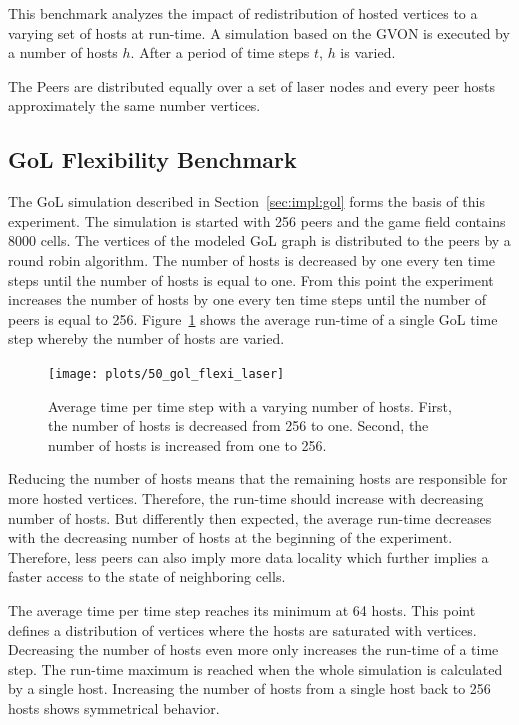 This benchmark analyzes the impact of redistribution of hosted
vertices to a varying set of hosts at run-time. A simulation based on the
GVON is executed by a number of hosts $h$. After a period of time steps
$t$, $h$ is varied.

The Peers are distributed equally over a set of laser nodes and
every peer hosts approximately the same number vertices.

\subsection{GoL Flexibility Benchmark}

The GoL simulation described in Section~\ref{sec:impl:gol} forms the
basis of this experiment.  The simulation is started with 256 peers
and the game field contains 8000 cells. The vertices of the modeled
GoL graph is distributed to the peers by a round robin algorithm.  The
number of hosts is decreased by one every ten time steps until the
number of hosts is equal to one. From this point the experiment
increases the number of hosts by one every ten time steps until the
number of peers is equal to 256. Figure~\ref{fig:gol_flexi_laser}
shows the average run-time of a single GoL time step whereby the
number of hosts are varied.

\begin{figure}[H]
  \texttt{[image: plots/50\_gol\_flexi\_laser]}
  \caption{Average time per time step with a varying number of
    hosts. First, the number of hosts is decreased from 256 to
    one. Second, the number of hosts is increased from one to 256.}
  \label{fig:gol_flexi_laser}
\end{figure}

\noindent Reducing the number of hosts means that the remaining hosts are
responsible for more hosted vertices. Therefore, the run-time should increase
with decreasing number of hosts.  But differently then expected, the
average run-time decreases with the decreasing number of hosts at the
beginning of the experiment. Therefore, less peers can also imply more
data locality which further implies a faster access to the state of
neighboring cells.

The average time per time step reaches its minimum at 64 hosts. This
point defines a distribution of vertices where the hosts are saturated
with vertices.  Decreasing the number of hosts even more only
increases the run-time of a time step. The run-time maximum is reached
when the whole simulation is calculated by a single host.  Increasing
the number of hosts from a single host back to 256 hosts shows
symmetrical behavior.




\cleardoublepage

